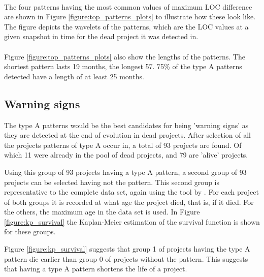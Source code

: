 \paragraph{}
The four patterns having the most common values of maximum LOC difference are
shown in Figure \ref{figure:top_patterns_plots} to illustrate how these look
like. The figure depicts the wavelets of the patterns, which are the LOC values
at a given snapshot in time for the dead project it was detected in.



\paragraph{}
Figure \ref{figure:top_patterns_plots} also show the lengths of the patterns.
The shortest pattern lasts 19 months, the longest 57. 75\% of the type A
patterns detected have a length of at least 25 months.

\subsection{Warning signs}
The type A patterns would be the best candidates for being 'warning signs' as
they are detected at the end of evolution in dead projects. After selection of
all the projects patterns of type A occur in, a total of 93 projects are found.
Of which 11 were already in the pool of dead projects, and 79 are 'alive'
projects.

Using this group of 93 projects having a type A pattern, a second group of 93
projects can be selected having not the pattern. This second group is
representative to the complete data set, again using the tool by
\citet{nagappan}. For each project of both groups it is recorded at what age the
project died, that is, if it died. For the others, the maximum age in the data
set is used. In Figure \ref{figure:kp_survival} the Kaplan-Meier estimation of
the survival function is shown for these groups.



\noindent
Figure \ref{figure:kp_survival} suggests that group 1 of projects having the
type A pattern die earlier than group 0 of projects without the pattern. This
suggests that having a type A pattern shortens the life of a project.

